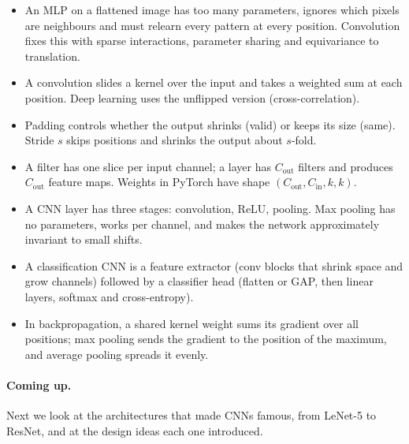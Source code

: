 \documentclass[12pt, a4paper]{article}
\begin{document}
\begin{itemize}
  \item An MLP on a flattened image has too many parameters, ignores which
        pixels are neighbours and must relearn every pattern at every
        position. Convolution fixes this with sparse interactions, parameter
        sharing and equivariance to translation.
  \item A convolution slides a kernel over the input and takes a weighted sum
        at each position. Deep learning uses the unflipped version
        (cross-correlation).
  \item Padding controls whether the output shrinks (valid) or keeps its size
        (same). Stride $s$ skips positions and shrinks the output about
        $s$-fold.
  \item A filter has one slice per input channel; a layer has $C_{\text{out}}$
        filters and produces $C_{\text{out}}$ feature maps. Weights in PyTorch
        have shape $(C_{\text{out}}, C_{\text{in}}, k, k)$.
  \item A CNN layer has three stages: convolution, ReLU, pooling. Max pooling
        has no parameters, works per channel, and makes the network
        approximately invariant to small shifts.
  \item A classification CNN is a feature extractor (conv blocks that shrink
        space and grow channels) followed by a classifier head (flatten or
        GAP, then linear layers, softmax and cross-entropy).
  \item In backpropagation, a shared kernel weight sums its gradient over all
        positions; max pooling sends the gradient to the position of the
        maximum, and average pooling spreads it evenly.
\end{itemize}

\paragraph{Coming up.}
Next we look at the architectures that made CNNs famous, from LeNet-5 to
ResNet, and at the design ideas each one introduced.
\end{document}
